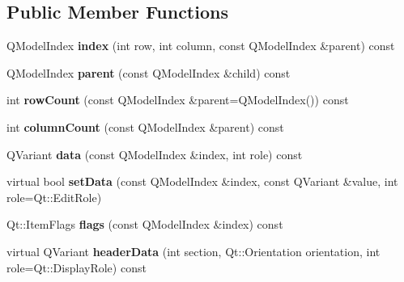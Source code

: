 \subsection*{Public Member Functions}
\begin{DoxyCompactItemize}
\item 
\mbox{\label{class_poppler_1_1_opt_content_model_abcdc63e9e7f7f7c9d0f8a4efb5ac28d8}} 
Q\+Model\+Index {\bfseries index} (int row, int column, const Q\+Model\+Index \&parent) const
\item 
\mbox{\label{class_poppler_1_1_opt_content_model_a760d6a6753b3fac3ff63e6337a338228}} 
Q\+Model\+Index {\bfseries parent} (const Q\+Model\+Index \&child) const
\item 
\mbox{\label{class_poppler_1_1_opt_content_model_a70a1834aea057ce102706a2b4b0ff794}} 
int {\bfseries row\+Count} (const Q\+Model\+Index \&parent=Q\+Model\+Index()) const
\item 
\mbox{\label{class_poppler_1_1_opt_content_model_ab5c89115e4bea486da1536d99e25447f}} 
int {\bfseries column\+Count} (const Q\+Model\+Index \&parent) const
\item 
\mbox{\label{class_poppler_1_1_opt_content_model_a12af2bb5d369c2136d141ccc364fa0de}} 
Q\+Variant {\bfseries data} (const Q\+Model\+Index \&index, int role) const
\item 
\mbox{\label{class_poppler_1_1_opt_content_model_a33dbc60d8675a6ae33d609b8e17ff3f2}} 
virtual bool {\bfseries set\+Data} (const Q\+Model\+Index \&index, const Q\+Variant \&value, int role=Qt\+::\+Edit\+Role)
\item 
\mbox{\label{class_poppler_1_1_opt_content_model_a86fbd9abd69a1487d8fc5d369b12d9b2}} 
Qt\+::\+Item\+Flags {\bfseries flags} (const Q\+Model\+Index \&index) const
\item 
\mbox{\label{class_poppler_1_1_opt_content_model_acf3c8e4c51cebe90b34e006c0f1641ab}} 
virtual Q\+Variant {\bfseries header\+Data} (int section, Qt\+::\+Orientation orientation, int role=Qt\+::\+Display\+Role) const
\end{DoxyCompactItemize}
